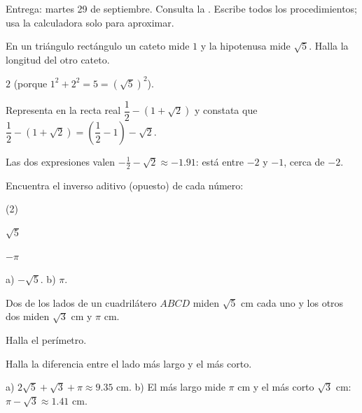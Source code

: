 \documentclass[11pt]{article}
\begin{document}
\encabezado

\begin{instrucciones}
Entrega: martes 29 de septiembre. Consulta la .
Escribe todos los procedimientos; usa la calculadora solo para aproximar.
\end{instrucciones}

\begin{preguntas}

\pregunta En un triángulo rectángulo un cateto mide $1$ y la hipotenusa mide $\sqrt{5}$. Halla
la longitud del otro cateto.
\begin{solucion}[1.8cm]
$2$ (porque $1^2 + 2^2 = 5 = (\sqrt{5})^2$).
\end{solucion}

\pregunta Representa en la recta real $\dfrac{1}{2} - (1 + \sqrt{2})$ y constata que
$\dfrac{1}{2} - (1 + \sqrt{2}) = \left(\dfrac{1}{2} - 1\right) - \sqrt{2}$.
\begin{center}
\end{center}
\begin{solucion}[2cm]
Las dos expresiones valen $-\frac{1}{2} - \sqrt{2} \approx -\num{1,91}$: está entre $-2$ y
$-1$, cerca de $-2$.
\end{solucion}

\pregunta Encuentra el inverso aditivo (opuesto) de cada número:
\begin{opciones*}(2)
  \item $\sqrt{5}$
  \item $-\pi$
\end{opciones*}
\begin{solucion}[1.6cm]
a) $-\sqrt{5}$. b) $\pi$.
\end{solucion}

\pregunta Dos de los lados de un cuadrilátero $ABCD$ miden $\sqrt{5}$ cm cada uno y los otros
dos miden $\sqrt{3}$ cm y $\pi$ cm.
\begin{opciones}
  \item Halla el perímetro.
  \item Halla la diferencia entre el lado más largo y el más corto.
\end{opciones}
\begin{solucion}[2cm]
a) $2\sqrt{5} + \sqrt{3} + \pi \approx \num{9,35}$ cm. b) El más largo mide $\pi$ cm y el más
corto $\sqrt{3}$ cm: $\pi - \sqrt{3} \approx \num{1,41}$ cm.
\end{solucion}

\end{preguntas}
\end{document}
